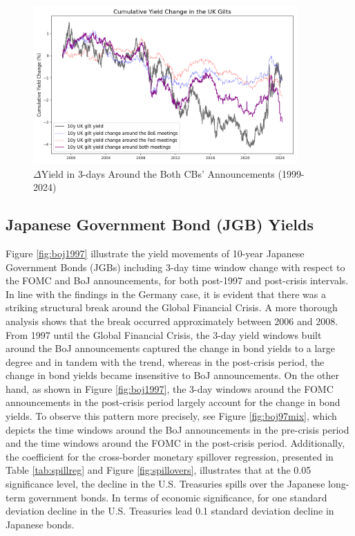 \begin{figure}[!htbp]
    \centering
    \caption{$\Delta$Yield in 3-days Around the Both CBs' Announcements (1999-2024)}    \includegraphics[width=0.9\textwidth]{figures/1999_uk_gilts_figure1a_combined.png}

    \label{fig:uk1999both}
\end{figure}



\subsection{Japanese Government Bond (JGB) Yields}

Figure \ref{fig:boj1997} illustrate the yield movements of 10-year Japanese Government Bonds (JGBs) including 3-day time window change with respect to the FOMC and BoJ announcements, for both post-1997 and post-crisis intervals. In line with the findings in the Germany case, it is evident that there was a striking structural break around the Global Financial Crisis. A more thorough analysis shows that the break occurred approximately between 2006 and 2008. From 1997 until the Global Financial Crisis, the 3-day yield windows built around the BoJ announcements captured the change in bond yields to a large degree and in tandem with the trend, whereas in the post-crisis period, the change in bond yields became insensitive to BoJ announcements. On the other hand, as shown in Figure \ref{fig:boj1997}, the 3-day windows around the FOMC announcements in the post-crisis period largely account for the change in bond yields. To observe this pattern more precisely, see Figure \ref{fig:boj97mix}, which depicts the time windows around the BoJ announcements in the pre-crisis period and the time windows around the FOMC in the post-crisis period. Additionally, the coefficient for the cross-border monetary spillover regression, presented in Table \ref{tab:spillreg} and Figure \ref{fig:spillovers}, illustrates that at the 0.05 significance level, the decline in the U.S. Treasuries spills over the Japanese long-term government bonds. In terms of economic significance, for one standard deviation decline in the U.S. Treasuries lead 0.1 standard deviation decline in Japanese bonds.\\

